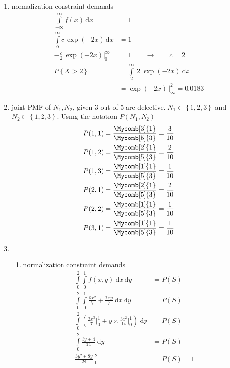 \begin{enumerate}
	
	\item normalization constraint demands \\
	
		\begin{align}
			\int\limits_{-\infty}^{\infty} f(x)\ \mathrm{d}x &= 1 \nonumber \\
			\int\limits_{0}^{\infty} c \ \exp(-2x)\ \mathrm{d}x &= 1 \nonumber\\
			-\frac{c}{2} \ \exp(-2x) \Big|_0^\infty &= 1 \qquad \to \qquad c = 2 \\
			P \left\{X > 2 \right\} &= \int\limits_{2}^{\infty}\ 2\ \exp(-2x)\ \mathrm{d}x \nonumber \\
			&= \exp(-2x)\ \Big|_{\infty}^{2} = 0.0183
		\end{align}
	
	
	\item joint PMF of $ N_1, N_2 $, given 3 out of 5 are defective. $ N_1 \in \left\{1, 2, 3\right\} $ and $ N_2 \in \left\{ 1, 2, 3 \right\} $. Using the notation $ P(N_1, N_2) $\\
	
	\begin{align}
		P(1, 1) = \frac{\Mycomb[3]{1}}{\Mycomb[5]{3}} = \frac{3}{10} \nonumber \\
		P(1, 2) = \frac{\Mycomb[2]{1}}{\Mycomb[5]{3}} = \frac{2}{10} \nonumber \\
		P(1, 3) = \frac{\Mycomb[1]{1}}{\Mycomb[5]{3}} = \frac{1}{10} \nonumber \\
		P(2, 1) = \frac{\Mycomb[2]{1}}{\Mycomb[5]{3}} = \frac{2}{10} \nonumber \\
		P(2, 2) = \frac{\Mycomb[1]{1}}{\Mycomb[5]{3}} = \frac{1}{10} \nonumber \\
		P(3, 1) = \frac{\Mycomb[1]{1}}{\Mycomb[5]{3}} = \frac{1}{10} \nonumber \\
	\end{align}
	
	\item 
	\begin{enumerate}
		
			\item 
			normalization constraint demands \\
			\begin{align}
				\int\limits_{0}^{2} \int\limits_{0}^{1} f(x, y)\ \mathrm{d}x \ \mathrm{d}y &= P(S) \nonumber \\
				\int\limits_{0}^{2} \int\limits_{0}^{1} \frac{6x^2}{7} + \frac{3xy}{7}\ \mathrm{d}x \ \mathrm{d}y &= P(S) \nonumber\\
				\int\limits_{0}^{2} \left(\frac{2x^3}{7} \Big|_0^1 + y \times \frac{3x^2}{14} \Big|_0^1  \right) \ \mathrm{d}y &= P(S) \nonumber \\
				\int\limits_{0}^{2} \frac{3y + 4}{14}\ \mathrm{d}y &= P(S) \nonumber \\
				\frac{3y^2 + 8y}{28} \Big|_0^2 &= P(S) = 1
			\end{align}
			

\end{enumerate}
\end{enumerate}
